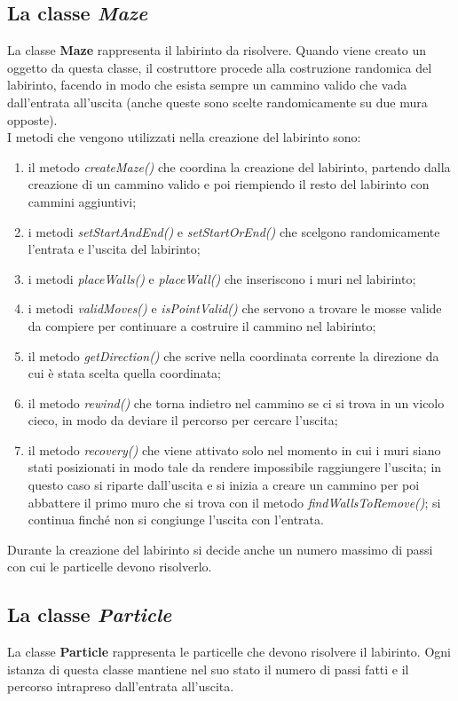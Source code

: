 \documentclass[10pt,twocolumn,letterpaper]{article}
\begin{document}
\subsection{La classe \textit{Maze}}
La classe \textbf{Maze} rappresenta il labirinto da risolvere. Quando viene creato un oggetto da questa classe, il costruttore procede alla costruzione randomica del labirinto, facendo in modo che esista sempre un cammino valido che vada dall'entrata all'uscita (anche queste sono scelte randomicamente su due mura opposte).\\
I metodi che vengono utilizzati nella creazione del labirinto sono:
\begin{enumerate}
\item{il metodo \textit{createMaze()} che coordina la creazione del labirinto, partendo dalla creazione di un cammino valido e poi riempiendo il resto del labirinto con cammini aggiuntivi;}
\item{i metodi \textit{setStartAndEnd()} e \textit{setStartOrEnd()} che scelgono randomicamente l'entrata e l'uscita del labirinto;}
\item{i metodi \textit{placeWalls()} e \textit{placeWall()} che inseriscono i muri nel labirinto;}
\item{i metodi \textit{validMoves()} e \textit{isPointValid()} che servono a trovare le mosse valide da compiere per continuare a costruire il cammino nel labirinto;}
\item{il metodo \textit{getDirection()} che scrive nella coordinata corrente la direzione da cui è stata scelta quella coordinata;}
\item{il metodo \textit{rewind()} che torna indietro nel cammino se ci si trova in un vicolo cieco, in modo da deviare il percorso per cercare l'uscita;}
\item{il metodo \textit{recovery()} che viene attivato solo nel momento in cui i muri siano stati posizionati in modo tale da rendere impossibile raggiungere l'uscita; in questo caso si riparte dall'uscita e si inizia a creare un cammino per poi abbattere il primo muro che si trova con il metodo \textit{findWallsToRemove()}; si continua finché non si congiunge l'uscita con l'entrata.}
\end{enumerate}
Durante la creazione del labirinto si decide anche un numero massimo di passi con cui le particelle devono risolverlo.

\subsection{La classe \textit{Particle}}
La classe \textbf{Particle} rappresenta le particelle che devono risolvere il labirinto. Ogni istanza di questa classe mantiene nel suo stato il numero di passi fatti e il percorso intrapreso dall'entrata all'uscita.
\end{document}
